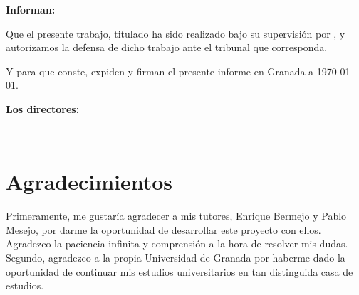 \textbf{Informan:}

\vspace{0.5cm}

Que el presente trabajo, titulado \textit{\textbf{\myTitle}}
ha sido realizado bajo su supervisión por \textbf{\myName}, y autorizamos la defensa de dicho trabajo ante el tribunal
que corresponda.

\vspace{0.5cm}

Y para que conste, expiden y firman el presente informe en Granada a \today.

\vspace{1cm}

\textbf{Los directores:}

\vspace{5cm}

\noindent \textbf{\myProf \ \ \ \ \ \myOtherProf}

\chapter*{Agradecimientos}

\thispagestyle{empty}
       \vspace{1cm}


Primeramente, me gustaría agradecer a mis tutores, Enrique Bermejo y Pablo Mesejo,
por darme la oportunidad de desarrollar este proyecto con ellos.
Agradezco la paciencia infinita y comprensión a la hora de resolver mis dudas.
Segundo, agradezco a la propia Universidad de Granada por haberme dado la oportunidad
de continuar mis estudios universitarios en tan distinguida casa de estudios.
\\
